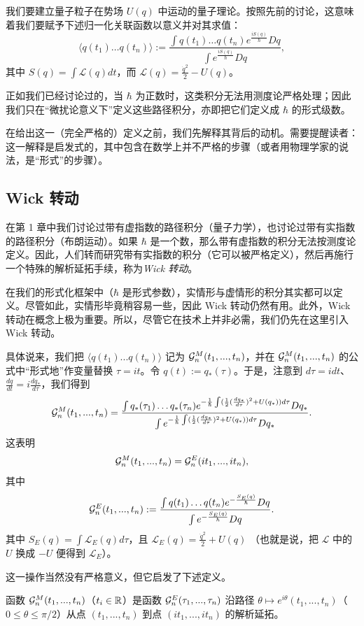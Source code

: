 我们要建立量子粒子在势场 $U(q)$ 中运动的量子理论。按照先前的讨论，这意味着我们要赋予下述归一化关联函数以意义并对其求值：
$$
\langle q(t_1) \ldots q(t_n)\rangle:=
\frac{\int q(t_1) \ldots q(t_n)e^{\frac{iS(q)}{\hbar}}Dq}{\int e^{\frac{iS(q)}{\hbar}}Dq}, 
$$
其中 $S(q)=\int {\mathcal L}(q)dt$，而 ${\mathcal L}(q)=\frac{\dot{q}^2}{2}-U(q)$。

正如我们已经讨论过的，当 $\hbar$ 为正数时，这类积分无法用测度论严格处理；因此我们只在“微扰论意义下”定义这些路径积分，亦即把它们定义成 $\hbar$ 的形式级数。

在给出这一（完全严格的）定义之前，我们先解释其背后的动机。需要提醒读者：这一解释是启发式的，其中包含在数学上并不严格的步骤（或者用物理学家的说法，是“形式”的步骤）。

\subsection{Wick 转动}

在第 1 章中我们讨论过带有虚指数的路径积分（量子力学），也讨论过带有实指数的路径积分（布朗运动）。如果 $\hbar$ 是一个数，那么带有虚指数的积分无法按测度论定义。因此，人们转而研究带有实指数的积分（它可以被严格定义），然后再施行一个特殊的解析延拓手续，称为\emph{Wick 转动}。

在我们的形式化框架中（$\hbar$ 是形式参数），实情形与虚情形的积分其实都可以定义。尽管如此，实情形毕竟稍容易一些，因此 Wick 转动仍然有用。此外，Wick 转动在概念上极为重要。所以，尽管它在技术上并非必需，我们仍先在这里引入 Wick 转动。

具体说来，我们把 $\langle q(t_1)...q(t_n)\rangle$ 记为 $\G^M_n(t_1,...,t_n)$，并在 $\G^M_n(t_1,...,t_n)$ 的公式中“形式地”作变量替换 $\tau=it$。令 $q(t):=q_*(\tau)$。于是，注意到 $d\tau=idt$、$\frac{dq}{dt}=i\frac{dq_*}{d\tau}$，我们得到
$$
\G^M_n(t_1,...,t_n)=
\frac{\int q_*(\tau_1) \ldots q_*(\tau_n)e^{-\frac{1}{\hbar}\int (\frac{1}{2}
(\frac{dq_*}{d\tau})^2+U(q_*))d\tau}Dq_*}{\int e^{-\frac{1}{\hbar}\int (\frac{1}{2}
(\frac{dq_*}{d\tau})^2+U(q_*))d\tau}Dq_*}. 
$$
这表明
$$
\G^M_n(t_1,...,t_n)=\G^E_n(it_1,...,it_n),
$$
其中
$$
\G^E_n(t_1,...,t_n):=
\frac{\int q(t_1) \ldots q(t_n)e^{-\frac{S_E(q)}{\hbar}}Dq}{\int e^{-\frac{S_E(q)}{\hbar}}Dq}. 
$$
其中 $S_E(q)=\int {\mathcal L}_E(q)d\tau$，且 ${\mathcal L}_E(q)=\frac{\dot{q}^2}{2}+U(q)$
（也就是说，把 ${\mathcal L}$ 中的 $U$ 换成 $-U$ 便得到 ${\mathcal L}_E$）。

这一操作当然没有严格意义，但它启发了下述定义。

\begin{definition}
函数 $\G^M_n(t_1,...,t_n)$（$t_i\in \Bbb R$）是函数 $\G^E_n(\tau_1,...,\tau_n)$ 沿路径
$\theta\mapsto e^{i\theta}(t_1,...,t_n)$（$0\le \theta\le \pi/2$）从点
$(t_1,...,t_n)$ 到点 $(it_1,...,it_n)$ 的解析延拓。
\end{definition}

